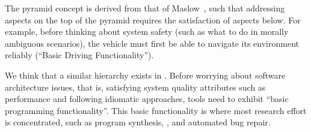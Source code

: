 The pyramid concept is derived from that of Maslow~\cite{Maslow1943}, such that addressing aspects on the top of the pyramid requires the satisfaction of aspects below. 
For example, before thinking about system safety (such as what to do in morally ambiguous scenarios), the vehicle must first be able to navigate its environment reliably (``Basic Driving Functionality'').

We think that a similar hierarchy exists in \AISE{}. Before worrying about software architecture issues, that is, satisfying system quality attributes such as performance and following idiomatic approaches, \AISE{} tools need to exhibit ``basic programming functionality''. This basic functionality is where most research effort is concentrated, such as program synthesis, \cct{}, and automated bug repair.








